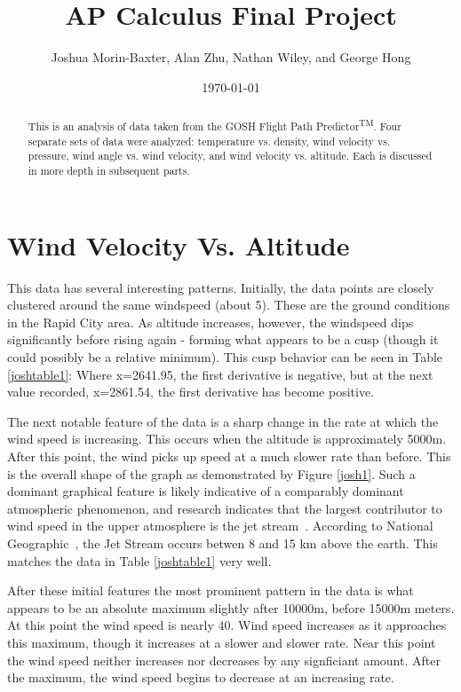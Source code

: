 \documentclass{article}
\begin{document}
\title{AP Calculus Final Project}
\author{Joshua Morin-Baxter, Alan Zhu, Nathan Wiley, and George Hong}
\date{\today}

\maketitle

\begin{abstract}
This is an analysis of data taken from the GOSH Flight Path Predictor\textsuperscript{TM}.  Four separate sets of data were analyzed: temperature vs. density, wind velocity vs. pressure, wind angle vs. wind velocity, and wind velocity vs. altitude. Each is discussed in more depth in subsequent parts.
\end{abstract}

\part{Wind Velocity Vs. Altitude}
This data has several interesting patterns.  Initially, the data points are closely clustered around the same windspeed (about 5\si{}).  These are the ground conditions in the Rapid City area.  As altitude increases, however, the windspeed dips significantly before rising again - forming what appears to be a cusp (though it could possibly be a relative minimum).  This cusp behavior can be seen in Table \ref{joshtable1}: Where x=2641.95, the first derivative is negative, but at the next value recorded, x=2861.54, the first derivative has become positive.

The next notable feature of the data is a sharp change in the rate at which the wind speed is increasing.  This occurs when the altitude is approximately 5000\si{m}. After this point, the wind picks up speed at a much slower rate than before.  This is the overall shape of the graph as demonstrated by Figure \ref{josh1}.  Such a dominant graphical feature is likely indicative of a comparably dominant atmospheric phenomenon, and research indicates that the largest contributor to wind speed in the upper atmosphere is the jet stream~\cite{National-Geographic}.  According to National Geographic~\cite{National-Geographic}, the Jet Stream occurs betwen 8 and 15 \si{km} above the earth.  This matches the data in Table \ref{joshtable1} very well.

After these initial features the most prominent pattern in the data is what appears to be an absolute maximum slightly after 10000\si{m}, before 15000\si{m} meters.  At this point the wind speed is nearly 40\si{}.  Wind speed increases as it approaches this maximum, though it increases at a slower and slower rate. Near this point the wind speed neither increases nor decreases by any signficiant amount.  After the maximum, the wind speed begins to decrease at an increasing rate.
\end{document}
